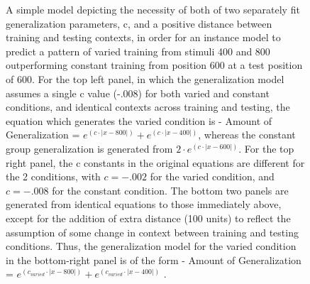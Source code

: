 \documentclass[
  12pt,
  letterpaper,
]{article}
\begin{document}
\begin{figure}


\caption{\label{fig-Toy-Model2}A simple model depicting the necessity of
both of two separately fit generalization parameters, c, and a positive
distance between training and testing contexts, in order for an instance
model to predict a pattern of varied training from stimuli 400 and 800
outperforming constant training from position 600 at a test position of
600. For the top left panel, in which the generalization model assumes a
single c value (-.008) for both varied and constant conditions, and
identical contexts across training and testing, the equation which
generates the varied condition is - Amount of Generalization =
\(e^{(c\cdot|x-800|)} + e^{(c\cdot|x-400|)}\), whereas the constant
group generalization is generated from \(2\cdot e^{(c\cdot|x-600|)}\).
For the top right panel, the c constants in the original equations are
different for the 2 conditions, with \(c=-.002\) for the varied
condition, and \(c=-.008\) for the constant condition. The bottom two
panels are generated from identical equations to those immediately
above, except for the addition of extra distance (100 units) to reflect
the assumption of some change in context between training and testing
conditions. Thus, the generalization model for the varied condition in
the bottom-right panel is of the form - Amount of Generalization =
\(e^{(c_{varied}\cdot|x-800|)}+e^{(c_{varied}\cdot|x-400|)}\) .}

\end{figure}%
\end{document}

